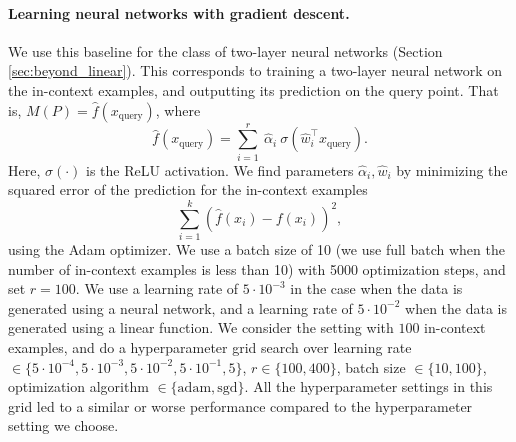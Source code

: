 \paragraph{Learning neural networks with gradient descent.} We use this baseline for the class of two-layer neural networks (Section \ref{sec:beyond_linear}). This corresponds to training a two-layer neural network on the in-context examples, and outputting its prediction on the query point. That is, $M(P) = \hat{f}(x_\text{query})$, where 
\[
\hat{f}(x_\text{query}) = \sum_{i=1}^r ~ \hat{\alpha}_i ~ \sigma(\hat{w}_i^\top x_\text{query}).
\]
Here, $\sigma(\cdot)$ is the ReLU activation.
We find parameters $\hat{\alpha}_i, \hat{w}_i$ by minimizing the squared error of the prediction for the in-context examples
\[
\sum_{i=1}^k \left(\hat{f}(x_i) - f(x_i)\right)^2,
\]
using the Adam optimizer. %
We use a batch size of 10 (we use full batch when the number of in-context examples is less than 10) with 5000 optimization steps, and set $r = 100$. We use a learning rate of $5\cdot 10^{-3}$ in the case when the data is generated using a neural network, and a learning rate of $5\cdot 10^{-2}$ when the data is generated using a linear function. We consider the setting with $100$ in-context examples, and do a hyperparameter grid search over learning rate $\in \{5\cdot 10^{-4}, 5\cdot 10^{-3}, 5\cdot 10^{-2}, 5\cdot 10^{-1}, 5\}$, $r \in \{100, 400\}$, batch size $\in \{10, 100\}$, optimization algorithm $\in \{\text{adam}, \text{sgd}\}$. All the hyperparameter settings in this grid led to a similar or worse performance compared to the hyperparameter setting we choose. 





